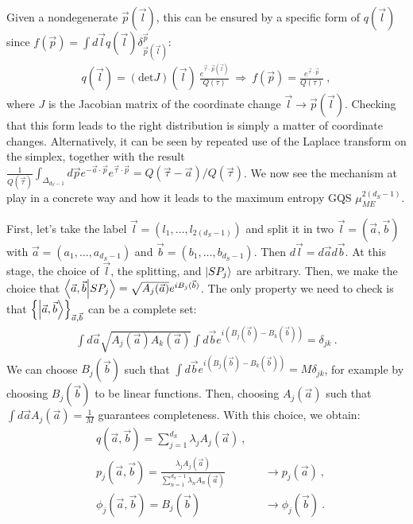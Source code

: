 \documentclass[draft,nofootinbib,pre,twocolumn,showpacs,showkeys,groupaddress,preprintnumbers,floatfix]{revtex4-1}
\newcommand{\1}{\mathbbm{1}}
\begin{document}
Given a nondegenerate $\vec{p}(\vec{l})$, this can be ensured by a specific form of $q(\vec{l})$ since $f(\vec{p}) = \int d\vec{l} q(\vec{l})\delta^{\vec{p}}_{\vec{p}(\vec{l})}$:
\begin{align*}
q(\vec{l}) = \left(\mathrm{det} J \right)\!(\vec{l})~\frac{e^{\vec{\tau}\cdot \vec{p}(\vec{l})}}{Q(\tau)}~\Rightarrow~f(\vec{p}) = \frac{e^{\vec{\tau} \cdot \vec{p}}}{Q(\tau)}
  ~,
\end{align*}
where $J$ is the Jacobian matrix of the coordinate change $\vec{l} \to
\vec{p}(\vec{l})$. Checking that this form leads to the right distribution is
simply a matter of coordinate changes. Alternatively, it can be seen by
repeated use of the Laplace transform on the simplex, together with the result
$\frac{1}{Q(\vec{\tau})}\int_{\Delta_{d_S-1}}\!\!\! d \vec{p} e^{-\vec{a}\cdot
\vec{p}}e^{\vec{\tau}\cdot \vec{p}} = Q(\vec{\tau}-\vec{a})/Q(\vec{\tau})$.  We
now see the mechanism at play in a concrete way and how it leads to the maximum
entropy GQS $\mu_{ME}^{2(d_S-1)}$.

First, let's take the label $\vec{l} = (l_1,\ldots,l_{2(d_S-1)})$ and split it
in two $\vec{l} = (\vec{a},\vec{b})$ with $\vec{a} = (a_1,\ldots,a_{d_S-1})$
and $\vec{b} = (b_1,\ldots,b_{d_S-1})$. Then $d\vec{l} = d\vec{a} d\vec{b}$. At
this stage, the choice of $\vec{l}$, the splitting, and $\ket{SP_j}$ are
arbitrary. Then, we make the choice that $\braket{\vec{a},\vec{b}}{SP_j} =
\sqrt{A_j(\vec{a})}e^{iB_j(\vec{b})}$. The only property we need to check is
that $\left\{ \ket{\vec{a},\vec{b}}\right\}_{\vec{a},\vec{b}}$ can be a
complete set:
\begin{align*}
\int d\vec{a} \sqrt{A_j(\vec{a})A_k(\vec{a})} \int d\vec{b} e^{i(B_j(\vec{b})-B_k(\vec{b}))} = \delta_{jk}
  ~.
\end{align*}
We can choose $B_j(\vec{b})$ such that $\int d\vec{b} e^{i(B_j(\vec{b})-B_k(\vec{b}))} = M \delta_{jk}$, for example by choosing $B_j(\vec{b})$ 
to be linear functions. Then, choosing $A_j(\vec{a})$ such that $\int d\vec{a} A_j(\vec{a}) = \frac{1}{M}$ guarantees completeness. With this
choice, we obtain:
\begin{align*}
&q(\vec{a},\vec{b}) = \sum_{j=1}^{d_S} \lambda_j A_j(\vec{a})~,\\
&p_j(\vec{a},\vec{b}) = \frac{\lambda_j A_j(\vec{a})}{\sum_{n=1}^{d_S-1}\lambda_n A_n(\vec{a})} &&\to p_j(\vec{a})~,\\
&\phi_j(\vec{a},\vec{b}) = B_j(\vec{b}) &&\to \phi_j(\vec{b})
  ~.
\end{align*}
\end{document}

